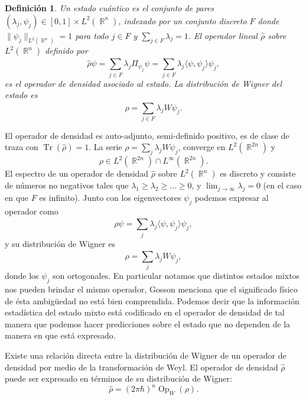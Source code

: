 \documentclass[a4paper]{report}
\DeclareMathOperator{\R}{\mathbb{R}}
\DeclareMathOperator{\Tr}{Tr}
\DeclareMathOperator{\Op}{Op}
\newtheorem{definition}{Definición}
\begin{document}
  \begin{definition}
    Un estado cuántico es el conjunto de pares $(\lambda_j,
    \psi_j) \in [0,1] \times L^2(\R^{n})$, indexado por un
    conjunto discreto $F$ donde $\|\psi_j\|_{L^2(\R^{n})} =
    1$ para todo $j \in F$ y $\sum_{j \in F} \lambda_j = 1$.
    El operador lineal $\hat{\rho}$ sobre $L^2(\R^{n})$
    definido por
    \begin{equation}
      \hat{\rho} \psi
      = \sum_{j \in F}^{} \lambda_j \Pi_{\psi_j} \psi
      = \sum_{j \in F}^{} \lambda_j \langle \psi, \psi_j
      \rangle \psi_j,
    \end{equation}
    es el operador de densidad asociado al estado. La
    distribución de Wigner del estado es
    \begin{equation}
      \rho = \sum_{j \in F}^{} \lambda_j W\psi_j.
    \end{equation}
  \end{definition}
  El operador de densidad es auto-adjunto, semi-definido
  positivo, es de clase de traza con $\Tr(\hat{\rho}) = 1$.
  La serie $\rho = \sum_{j}^{} \lambda_j W\psi_j$, converge
  en $L^2(\R^{2n})$ y 
  \[
    \rho \in L^2(\R^{2n}) \cap L^{\infty}(\R^{2n}).
  \] 
  El espectro de un operador de densidad $\hat{\rho}$ sobre
  $L^2(\R^{n})$ es discreto y consiste de números no
  negativos tales que $\lambda_1 \geq \lambda_2 \geq \ldots
  \geq 0$, y $\lim_{j \to \infty} \lambda_j = 0$ (en el
  caso en que $F$ es infinito). Junto con los eigenvectores
  $\psi_j$ podemos expresar al operador como
  \[
    \rho \psi
    = \sum_{j}^{} \lambda_j \langle \psi, \psi_j \rangle
    \psi_j,
  \] 
  y su distribución de Wigner es
  \[
    \rho 
    = \sum_{j}^{} \lambda_j W\psi_j,
  \] 
  donde los $\psi_j$ son ortogonales. En particular notamos
  que distintos estados mixtos nos pueden brindar el mismo
  operador, Gosson menciona que el significado físico de
  ésta ambigüedad no está bien comprendida. Podemos decir
  que la información estadística del estado mixto está
  codificado en el operador de densidad de tal manera que
  podemos hacer predicciones sobre el estado que no dependen
  de la manera en que está expresado. 

  Existe una relación directa entre la distribución de
  Wigner de un operador de densidad por medio de la
  transformación de Weyl. El operador de densidad
  $\hat{\rho}$ puede ser expresado en términos de su
  distribución de Wigner:
  \begin{equation}
    \hat{\rho} 
    = (2\pi\hbar)^{n} \Op_W(\rho).
  \end{equation}
\end{document}
